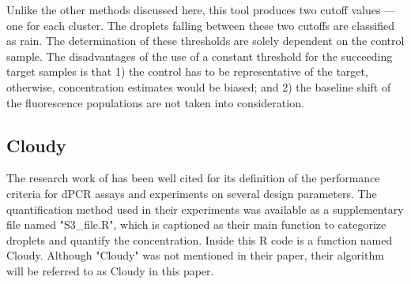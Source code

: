 Unlike the other methods discussed here, this tool produces two cutoff values — one for each cluster. The droplets falling between these two cutoffs are classified as rain. The determination of these thresholds are solely dependent on the control sample. The disadvantages of the use of a constant threshold for the succeeding target samples is that 1) the control has to be representative of the target, otherwise, concentration estimates would be biased; and 2) the baseline shift of the fluorescence populations are not taken into consideration.

\subsection{Cloudy}
\label{sec:peakdetectionkde}
The research work of  has been well cited for its definition of the performance criteria for dPCR assays and experiments on several design parameters. The quantification method used in their experiments was available as a supplementary file named "S3\_file.R", which is captioned as their main function to categorize droplets and quantify the concentration. Inside this R code is a function named Cloudy. Although "Cloudy" was not mentioned in their paper, their algorithm will be referred to as Cloudy in this paper. 

